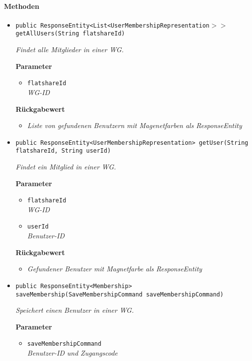      \paragraph*{Methoden}
     \begin{itemize}
     	\item{\texttt{public ResponseEntity<List<UserMembershipRepresentation$>>$ getAllUsers(String flatshareId)}}
     	
     	\textit{Findet alle Mitglieder in einer WG.}
     	
     	\textbf{Parameter}
     	\begin{itemize}
     		\item\texttt{flatshareId}\\
     		\textit{WG-ID}  
     	\end{itemize}
     	
     	\textbf{Rückgabewert}
     	\begin{itemize}
     		\item\textit{Liste von gefundenen Benutzern mit Magenetfarben als ResponseEntity} 
     	\end{itemize}
     
     \item{\texttt{public ResponseEntity<UserMembershipRepresentation> getUser(String flatshareId, String userId)}}
     	
     	\textit{Findet ein Mitglied in einer WG.}
     	
     	\textbf{Parameter}
     	\begin{itemize}
     		\item\texttt{flatshareId}\\
     		\textit{WG-ID}
     		\item\texttt{userId}\\
     		\textit{Benutzer-ID}  
     	\end{itemize}
     	
     	\textbf{Rückgabewert}
     	\begin{itemize}
     		\item\textit{Gefundener Benutzer mit Magnetfarbe als ResponseEntity}
     	\end{itemize}
     	
     	\item{\texttt{public ResponseEntity<Membership> saveMembership(SaveMembershipCommand saveMembershipCommand)}}
     	
     	\textit{Speichert einen Benutzer in einer WG.}
     	
     	\textbf{Parameter}
     	\begin{itemize}
     		\item\texttt{saveMembershipCommand}\\
     		\textit{Benutzer-ID und Zugangscode}  
     	\end{itemize}
     	

\end{itemize}
